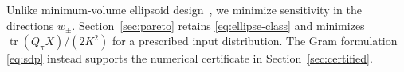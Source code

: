 Unlike minimum-volume ellipsoid design~\cite[Chap. 8]{boyd2004}, we minimize sensitivity in the directions $w_\pm$. Section~\ref{sec:pareto} retains \eqref{eq:ellipse-class} and minimizes $\operatorname{tr}(Q_\pi X)/(2K^2)$ for a prescribed input distribution. The Gram formulation \eqref{eq:sdp} instead supports the numerical certificate in Section~\ref{sec:certified}.
